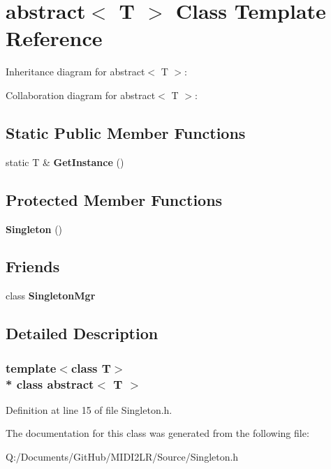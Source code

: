 \hypertarget{classabstract}{}\section{abstract$<$ T $>$ Class Template Reference}
\label{classabstract}


Inheritance diagram for abstract$<$ T $>$\+:


Collaboration diagram for abstract$<$ T $>$\+:
\subsection*{Static Public Member Functions}
\begin{DoxyCompactItemize}
\item 
static T \& {\bfseries Get\+Instance} ()\hypertarget{classabstract_aca9929a78bea316bf71179d83f3512bb}{}\label{classabstract_aca9929a78bea316bf71179d83f3512bb}

\end{DoxyCompactItemize}
\subsection*{Protected Member Functions}
\begin{DoxyCompactItemize}
\item 
{\bfseries Singleton} ()\hypertarget{classabstract_a0f3f510d4b8bb88a7678455ea07e1ec6}{}\label{classabstract_a0f3f510d4b8bb88a7678455ea07e1ec6}

\end{DoxyCompactItemize}
\subsection*{Friends}
\begin{DoxyCompactItemize}
\item 
class {\bfseries Singleton\+Mgr}\hypertarget{classabstract_abc6215f3bdb243af55a8a609d5b373e8}{}\label{classabstract_abc6215f3bdb243af55a8a609d5b373e8}

\end{DoxyCompactItemize}


\subsection{Detailed Description}
\subsubsection*{template$<$class T$>$\\*
class abstract$<$ T $>$}



Definition at line 15 of file Singleton.\+h.



The documentation for this class was generated from the following file\+:\begin{DoxyCompactItemize}
\item 
Q\+:/\+Documents/\+Git\+Hub/\+M\+I\+D\+I2\+L\+R/\+Source/Singleton.\+h\end{DoxyCompactItemize}
